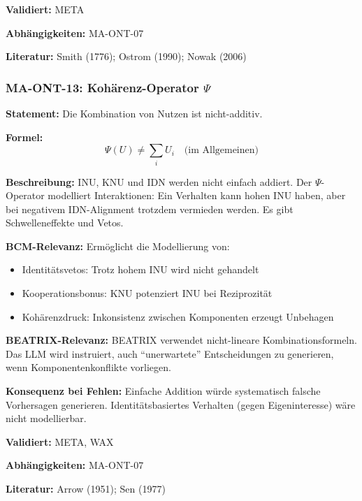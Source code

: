 \textbf{Validiert:} META

\textbf{Abhängigkeiten:} MA-ONT-07

\textbf{Literatur:} Smith (1776); Ostrom (1990); Nowak (2006)


\subsubsection*{MA-ONT-13: Kohärenz-Operator $\Psi$}

\textbf{Statement:} Die Kombination von Nutzen ist nicht-additiv.

\textbf{Formel:}
\begin{equation}
\Psi(U) \neq \sum_i U_i \quad \text{(im Allgemeinen)}
\end{equation}

\textbf{Beschreibung:}
INU, KNU und IDN werden nicht einfach addiert. Der $\Psi$-Operator modelliert Interaktionen: Ein Verhalten kann hohen INU haben, aber bei negativem IDN-Alignment trotzdem vermieden werden. Es gibt Schwelleneffekte und Vetos.

\textbf{BCM-Relevanz:}
Ermöglicht die Modellierung von:
\begin{itemize}
    \item Identitätsvetos: Trotz hohem INU wird nicht gehandelt
    \item Kooperationsbonus: KNU potenziert INU bei Reziprozität
    \item Kohärenzdruck: Inkonsistenz zwischen Komponenten erzeugt Unbehagen
\end{itemize}

\textbf{BEATRIX-Relevanz:}
BEATRIX verwendet nicht-lineare Kombinationsformeln. Das LLM wird instruiert, auch ``unerwartete'' Entscheidungen zu generieren, wenn Komponentenkonflikte vorliegen.

\textbf{Konsequenz bei Fehlen:}
Einfache Addition würde systematisch falsche Vorhersagen generieren. Identitätsbasiertes Verhalten (gegen Eigeninteresse) wäre nicht modellierbar.

\textbf{Validiert:} META, WAX

\textbf{Abhängigkeiten:} MA-ONT-07

\textbf{Literatur:} Arrow (1951); Sen (1977)


